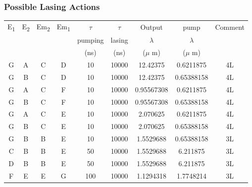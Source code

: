 \documentclass[a4paper,11pt]{article}
\begin{document}
\subsubsection*{Possible Lasing Actions}
\label{sec:org991b4e5}
\begin{center}
\begin{tabular}{|c|c|c|c|c|c|c|c|c|}
\hline
E\textsubscript{1} & E\textsubscript{2} & Em\textsubscript{2} & Em\textsubscript{1} & \(\tau\) & \(\tau\) & Output & pump & Comment\\
 &  &  &  & pumping & lasing & \(\lambda\) & \(\lambda\) & \\
 &  &  &  & (ns) & (ns) & (\(\mu\) m) & (\(\mu\) m) & \\
\hline
G & A & C & D & 10 & 10000 & 12.42375 & 0.6211875 & 4L\\
G & B & C & D & 10 & 10000 & 12.42375 & 0.65388158 & 4L\\
G & A & C & F & 10 & 10000 & 0.95567308 & 0.6211875 & 4L\\
G & B & C & F & 10 & 10000 & 0.95567308 & 0.65388158 & 4L\\
G & A & C & E & 10 & 10000 & 2.070625 & 0.6211875 & 4L\\
G & B & C & E & 10 & 10000 & 2.070625 & 0.65388158 & 4L\\
G & B & B & E & 10 & 10000 & 1.5529688 & 0.65388158 & 3L\\
C & B & B & E & 50 & 10000 & 1.5529688 & 6.211875 & 3L\\
D & B & B & E & 50 & 10000 & 1.5529688 & 6.211875 & 3L\\
F & E & E & G & 100 & 10000 & 1.1294318 & 1.7748214 & 3L\\
\hline
\end{tabular}
\end{center}
\end{document}
